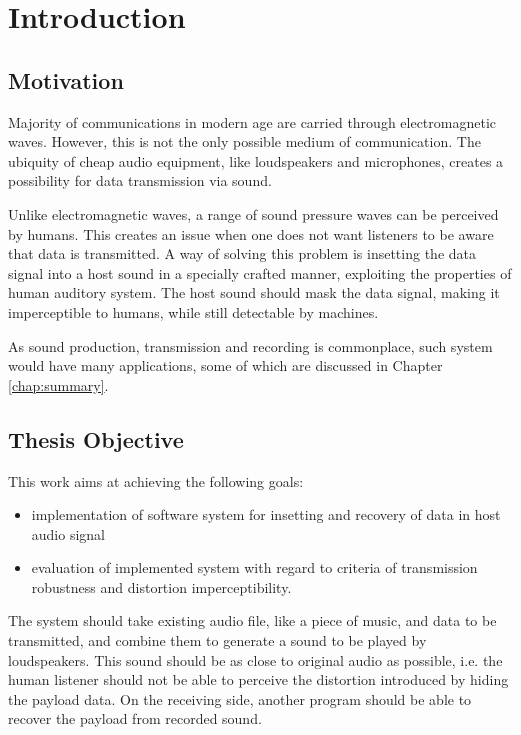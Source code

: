 \chapter{Introduction}

\section{Motivation}

Majority of communications in modern age are carried through electromagnetic waves. However, this is not the only possible medium of communication.
The ubiquity of cheap audio equipment, like loudspeakers and microphones, creates a possibility for data transmission via sound.

Unlike electromagnetic waves, a range of sound pressure waves can be perceived by humans. This creates an issue when one does not want listeners to be aware that data is transmitted.
A way of solving this problem is insetting the data signal into a host sound in a specially crafted manner, exploiting the properties of human auditory system.
The host sound should mask the data signal, making it imperceptible to humans, while still detectable by machines.

As sound production, transmission and recording is commonplace, such system would have many applications, some of which are discussed in Chapter \ref{chap:summary}.

\section{Thesis Objective}

This work aims at achieving the following goals:

\begin{itemize}
  \item implementation of software system for insetting and recovery of data in host audio signal
  \item evaluation of implemented system with regard to criteria of transmission robustness and distortion imperceptibility.
\end{itemize}

The system should take existing audio file, like a piece of music, and data to be transmitted, and combine them to generate a sound to be played by loudspeakers.
This sound should be as close to original audio as possible, i.e. the human listener should not be able to perceive the distortion introduced by hiding the payload data.
On the receiving side, another program should be able to recover the payload from recorded sound.

